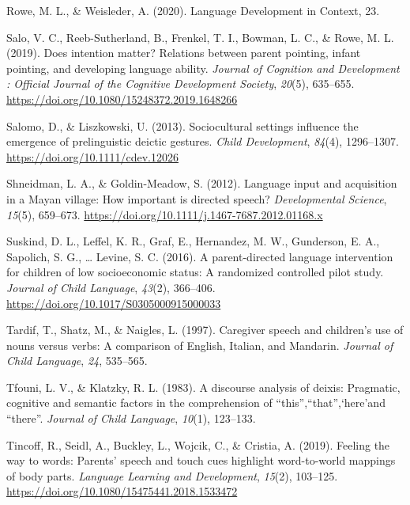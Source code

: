 \documentclass[
  english,
  man,floatsintext]{apa6}
\begin{document}
\leavevmode\hypertarget{ref-rowe_language_2020}{}%
Rowe, M. L., \& Weisleder, A. (2020). Language Development in Context, 23.

\leavevmode\hypertarget{ref-salo_does_2019}{}%
Salo, V. C., Reeb-Sutherland, B., Frenkel, T. I., Bowman, L. C., \& Rowe, M. L. (2019). Does intention matter? Relations between parent pointing, infant pointing, and developing language ability. \emph{Journal of Cognition and Development : Official Journal of the Cognitive Development Society}, \emph{20}(5), 635--655. \url{https://doi.org/10.1080/15248372.2019.1648266}

\leavevmode\hypertarget{ref-salomo_sociocultural_2013}{}%
Salomo, D., \& Liszkowski, U. (2013). Sociocultural settings influence the emergence of prelinguistic deictic gestures. \emph{Child Development}, \emph{84}(4), 1296--1307. \url{https://doi.org/10.1111/cdev.12026}

\leavevmode\hypertarget{ref-shneidman_language_2012}{}%
Shneidman, L. A., \& Goldin-Meadow, S. (2012). Language input and acquisition in a Mayan village: How important is directed speech? \emph{Developmental Science}, \emph{15}(5), 659--673. \url{https://doi.org/10.1111/j.1467-7687.2012.01168.x}

\leavevmode\hypertarget{ref-suskind_parent-directed_2016}{}%
Suskind, D. L., Leffel, K. R., Graf, E., Hernandez, M. W., Gunderson, E. A., Sapolich, S. G., \ldots{} Levine, S. C. (2016). A parent-directed language intervention for children of low socioeconomic status: A randomized controlled pilot study. \emph{Journal of Child Language}, \emph{43}(2), 366--406. \url{https://doi.org/10.1017/S0305000915000033}

\leavevmode\hypertarget{ref-tardif_caregiver_1997}{}%
Tardif, T., Shatz, M., \& Naigles, L. (1997). Caregiver speech and children's use of nouns versus verbs: A comparison of English, Italian, and Mandarin. \emph{Journal of Child Language}, \emph{24}, 535--565.

\leavevmode\hypertarget{ref-tfouni1983discourse}{}%
Tfouni, L. V., \& Klatzky, R. L. (1983). A discourse analysis of deixis: Pragmatic, cognitive and semantic factors in the comprehension of ``this'',``that'',`here'and ``there''. \emph{Journal of Child Language}, \emph{10}(1), 123--133.

\leavevmode\hypertarget{ref-tincoff_feeling_2019}{}%
Tincoff, R., Seidl, A., Buckley, L., Wojcik, C., \& Cristia, A. (2019). Feeling the way to words: Parents' speech and touch cues highlight word-to-world mappings of body parts. \emph{Language Learning and Development}, \emph{15}(2), 103--125. \url{https://doi.org/10.1080/15475441.2018.1533472}
\end{document}
